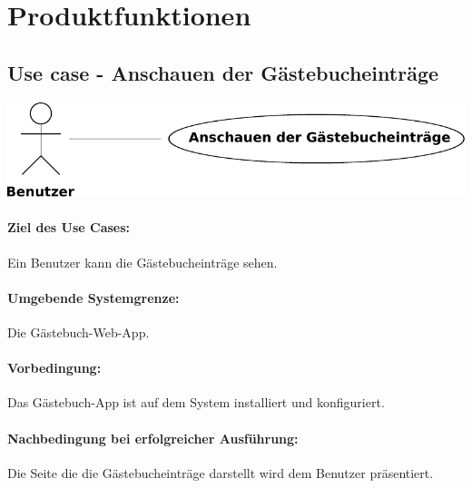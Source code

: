 \section{Produktfunktionen}

\subsection{Use case - Anschauen der Gästebucheinträge}

\begin{figurehere}
\includegraphics[width=\columnwidth]{use-case-show_entries}
\end{figurehere}

\paragraph{Ziel des Use Cases:}

\begin{asparaitem}
\item Ein Benutzer kann die Gästebucheinträge sehen.
\end{asparaitem}


\paragraph{Umgebende Systemgrenze:}

Die Gästebuch-Web-App.

\paragraph{Vorbedingung:}

Das Gästebuch-App ist auf dem System installiert und konfiguriert.

\paragraph{Nachbedingung bei erfolgreicher Ausführung:}

\begin{asparaitem}
\item Die Seite die die Gästebucheinträge darstellt wird dem Benutzer präsentiert.
\end{asparaitem}


